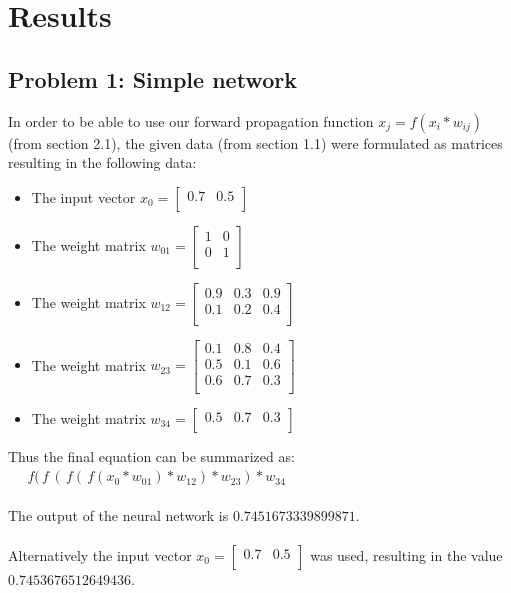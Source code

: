 \chapter{Results}
\section{Problem 1: Simple network}
In order to be able to use our forward propagation function $x_j=f(x_{i}*w_{ij})$(from section 2.1), the given data (from section 1.1) were formulated as matrices resulting in the following data:
\begin{itemize}
  \item The input vector $x_0=\left[ \begin{array}{rr}
											0.7 & 0.5  \\ 
									\end{array}\right]$
  \item The weight matrix $w_01=\left[ \begin{array}{rr}
  											1 & 0 \\
											0 & 1  \\ 
									\end{array}\right]$
\item The weight matrix $w_12=\left[ \begin{array}{rrr}
  											0.9 & 0.3 & 0.9\\
											0.1 & 0.2 & 0.4\\				 
									\end{array}\right]$
									\item The weight matrix $w_23=\left[ \begin{array}{rrr}
  											0.1 & 0.8 & 0.4\\
											0.5 & 0.1 & 0.6\\
											0.6 & 0.7 & 0.3\\
															 
									\end{array}\right]$
\item The weight matrix $w_34=\left[ \begin{array}{rrr}
  											0.5 & 0.7 & 0.3\\													 
									\end{array}\right]$
\end{itemize}

Thus the final equation can be summarized as:\\
$\;\;\;\;\;f(\,f\,(\,f(\,f(x_0*w_01)*w_12)*w_23)*w_34$\\\\
The output of the neural network is $0.7451673339899871$.
\\\\
Alternatively the input vector $x_0=\left[ \begin{array}{rr}
											0.7 & 0.5  \\ 
									\end{array}\right]$ was used, resulting in the value\\ $0.7453676512649436
$.


